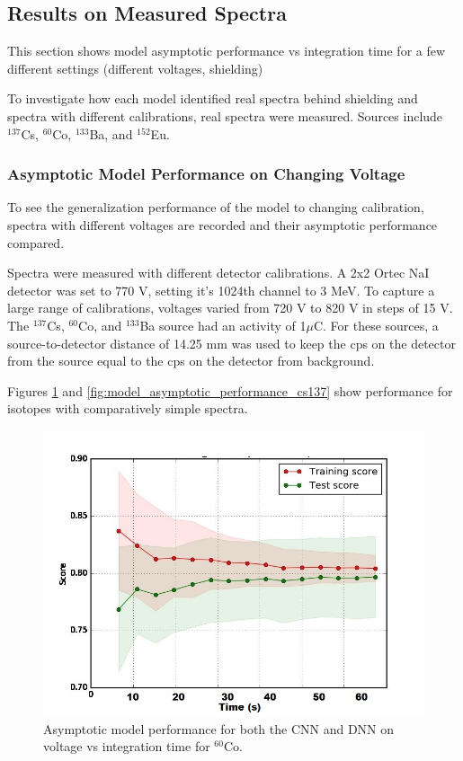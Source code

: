 \subsection{Results on Measured Spectra}

This section shows model asymptotic performance vs integration time for a few different settings (different voltages, shielding)

To investigate how each model identified real spectra behind shielding and spectra with different calibrations, real spectra were measured. Sources include $^{137}$Cs, $^{60}$Co, $^{133}$Ba, and $^{152}$Eu. 


\subsubsection{Asymptotic Model Performance on Changing Voltage}

To see the generalization performance of the model to changing calibration, spectra with different voltages are recorded and their asymptotic performance compared.

Spectra were measured with different detector calibrations. A 2x2 Ortec NaI detector was set to 770 V, setting it's 1024th channel to 3 MeV. To capture a large range of calibrations, voltages varied from 720 V to 820 V in steps of 15 V. The $^{137}$Cs, $^{60}$Co, and $^{133}$Ba source had an activity of 1$\mu$C. For these sources, a source-to-detector distance of 14.25 mm was used to keep the cps on the detector from the source equal to the cps on the detector from background.

Figures \ref{fig:model_asymptotic_performance_co60} and \ref{fig:model_asymptotic_performance_cs137} show performance for isotopes with comparatively simple spectra.

\begin{figure}[H]
	\centering
	\includegraphics[width=0.75\linewidth]{model_choice_hyperparameter_search_images/asymptotic_performance_time}
	\caption{Asymptotic model performance for both the CNN and DNN on voltage vs integration time for $^{60}$Co.}
	\label{fig:model_asymptotic_performance_co60}
\end{figure}

